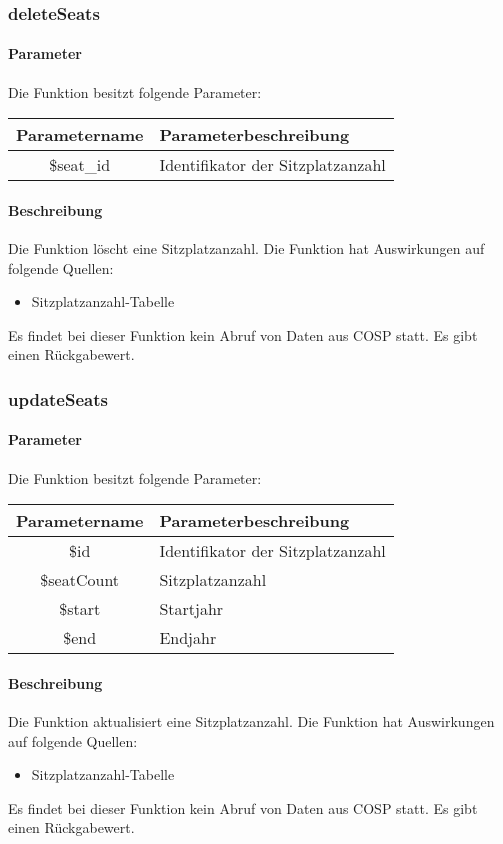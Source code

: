 \subsubsection{deleteSeats}
\paragraph{Parameter} Die Funktion besitzt folgende Parameter:
\begin{table}[H]
	\begin{tabular}{|c|p{11cm}|}
		\hline
		\textbf{Parametername} & \textbf{Parameterbeschreibung} \\ \hline
		\$seat\_id & Identifikator der Sitzplatzanzahl \\ \hline
	\end{tabular}
\end{table}
\paragraph{Beschreibung} Die Funktion löscht eine Sitzplatzanzahl. Die Funktion hat Auswirkungen auf folgende Quellen:
\begin{itemize}
	\item Sitzplatzanzahl-Tabelle
\end{itemize}
Es findet bei dieser Funktion kein Abruf von Daten aus {\glqq COSP\grqq} statt. Es gibt einen Rückgabewert.
\subsubsection{updateSeats}
\paragraph{Parameter} Die Funktion besitzt folgende Parameter:
\begin{table}[H]
	\begin{tabular}{|c|p{11cm}|}
		\hline
		\textbf{Parametername} & \textbf{Parameterbeschreibung} \\ \hline
		\$id        & Identifikator der Sitzplatzanzahl \\ \hline
		\$seatCount & Sitzplatzanzahl \\ \hline
		\$start     & Startjahr \\ \hline
		\$end       & Endjahr \\ \hline
	\end{tabular}
\end{table}
\paragraph{Beschreibung} Die Funktion aktualisiert eine Sitzplatzanzahl. Die Funktion hat Auswirkungen auf folgende Quellen:
\begin{itemize}
	\item Sitzplatzanzahl-Tabelle
\end{itemize}
Es findet bei dieser Funktion kein Abruf von Daten aus {\glqq COSP\grqq} statt. Es gibt einen Rückgabewert.
